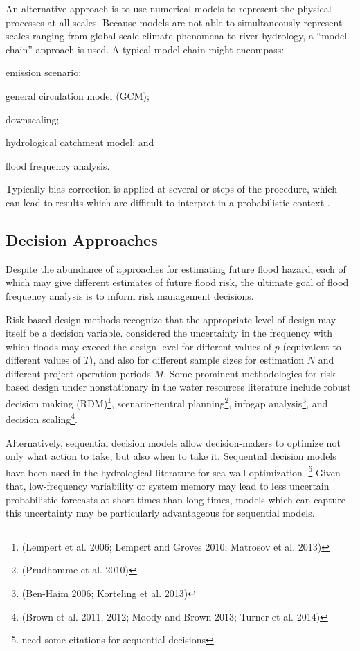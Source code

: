 \documentclass[12pt]{article}
\begin{document}
An alternative approach is to use numerical models to represent the physical processes at all scales.
Because models are not able to simultaneously represent scales ranging from global-scale climate phenomena to river hydrology, a ``model chain'' approach is used.
A typical model chain might encompass:
\begin{enumerate*}[label= (\roman*) ]
  \item emission scenario;
  \item general circulation model (GCM);
  \item downscaling;
  \item hydrological catchment model; and
  \item flood frequency analysis.
\end{enumerate*}
Typically bias correction is applied at several or steps of the procedure, which can lead to results which are difficult to interpret in a probabilistic context \citep{Dankers2009,Ott2013,Merz2014,Dittes2017}.

\subsection{Decision Approaches}

Despite the abundance of approaches for estimating future flood hazard, each of which may give different estimates of future flood risk, the ultimate goal of flood frequency analysis is to inform risk management decisions.

Risk-based design methods \citep[RBDM; see][]{Rosner2014} recognize that the appropriate level of design may itself be a decision variable.
\citet{Lall1987} considered the uncertainty in the frequency with which floods may exceed the design level for different values of \(p\) (equivalent to different values of \(T\)), and also for different sample sizes for estimation \(N\) and different project operation periods \(M\).
Some prominent methodologies for risk-based design under nonstationary in the water resources literature include robust decision making (RDM)\footnote{(Lempert et al. 2006; Lempert and Groves 2010; Matrosov et al. 2013)}, scenario-neutral planning\footnote{(Prudhomme et al. 2010)}, infogap analysis\footnote{(Ben-Haim 2006; Korteling et al. 2013)}, and decision scaling\footnote{(Brown et al. 2011, 2012; Moody and Brown 2013; Turner et al. 2014)}.

Alternatively, sequential decision models \citep[see][]{Russell2003,Howard1960} allow decision-makers to optimize not only what action to take, but also when to take it.
Sequential decision models have been used in the hydrological literature for sea wall optimization \citep{Lickley2014}.\footnote{need some citations for sequential decisions}
Given that, low-frequency variability or system memory may lead to less uncertain probabilistic forecasts at short times than long times, models which can capture this uncertainty may be particularly advantageous for sequential models.
\end{document}
